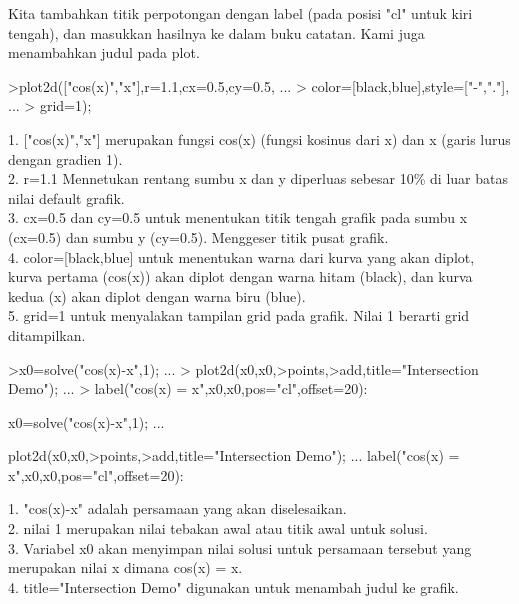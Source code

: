 \documentclass{article}
\begin{document}
\begin{eulernotebook}
\begin{eulercomment}
\begin{eulercomment}
\begin{eulercomment}
\begin{eulercomment}
\begin{eulercomment}
\begin{eulercomment}
\begin{eulercomment}
\begin{eulercomment}
\begin{eulercomment}
\begin{eulercomment}
\begin{eulercomment}
Kita tambahkan titik perpotongan dengan label (pada posisi "cl" untuk
kiri tengah), dan masukkan hasilnya ke dalam buku catatan. Kami juga
menambahkan judul pada plot.
\end{eulercomment}
\begin{eulerprompt}
>plot2d(["cos(x)","x"],r=1.1,cx=0.5,cy=0.5, ...
>  color=[black,blue],style=["-","."], ...
>  grid=1);
\end{eulerprompt}
\begin{eulercomment}
1. ["cos(x)","x"] merupakan fungsi cos(x) (fungsi kosinus dari x) dan
x (garis lurus dengan gradien 1).\\
2. r=1.1 Mennetukan rentang sumbu x dan y diperluas sebesar 10\% di
luar batas nilai default grafik.\\
3. cx=0.5 dan cy=0.5 untuk menentukan titik tengah grafik pada sumbu x
(cx=0.5) dan sumbu y (cy=0.5). Menggeser titik pusat grafik.\\
4. color=[black,blue] untuk menentukan warna dari kurva yang akan
diplot, kurva pertama (cos(x)) akan diplot dengan warna hitam (black),
dan kurva kedua (x) akan diplot dengan warna biru (blue).\\
5. grid=1 untuk menyalakan tampilan grid pada grafik. Nilai 1 berarti
grid ditampilkan.
\end{eulercomment}
\begin{eulerprompt}
>x0=solve("cos(x)-x",1);  ...
>  plot2d(x0,x0,>points,>add,title="Intersection Demo");  ...
>  label("cos(x) = x",x0,x0,pos="cl",offset=20):
\end{eulerprompt}
\begin{eulercomment}
x0=solve("cos(x)-x",1);  ...\\
\end{eulercomment}
\begin{eulerttcomment}
 plot2d(x0,x0,>points,>add,title="Intersection Demo");  ...
 label("cos(x) = x",x0,x0,pos="cl",offset=20):
\end{eulerttcomment}
\begin{eulercomment}
1. "cos(x)-x" adalah persamaan yang akan diselesaikan.\\
2. nilai 1 merupakan nilai tebakan awal atau titik awal untuk solusi.\\
3. Variabel x0 akan menyimpan nilai solusi untuk persamaan tersebut
yang merupakan nilai x dimana cos(x) = x.\\
4. title="Intersection Demo" digunakan untuk menambah judul ke grafik.\\

\end{eulercomment}
\end{eulercomment}
\end{eulercomment}
\end{eulercomment}
\end{eulercomment}
\end{eulercomment}
\end{eulercomment}
\end{eulercomment}
\end{eulercomment}
\end{eulercomment}
\end{eulercomment}
\end{eulernotebook}
\end{document}
